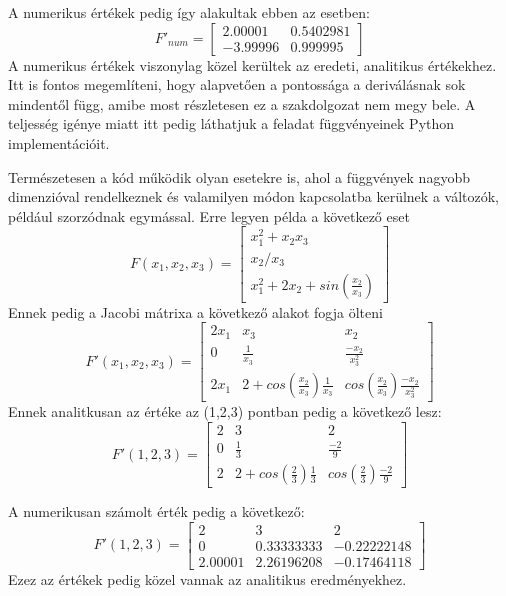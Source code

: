 \documentclass{article}
\theoremstyle{definition}
\theoremstyle{theorem}
\begin{document}
A numerikus értékek pedig így alakultak ebben az esetben:
\begin{equation*}
    F'_{num} = \begin{bmatrix}
        2.00001 & 0.5402981 \\
        -3.99996 & 0.999995
    \end{bmatrix}
\end{equation*}
A numerikus értékek viszonylag közel kerültek az eredeti, analitikus értékekhez.
Itt is fontos megemlíteni, hogy alapvetően a pontossága a deriválásnak sok mindentől függ, amibe most részletesen ez a szakdolgozat nem megy bele. A teljesség igénye miatt itt pedig láthatjuk a feladat függvényeinek Python implementációit.

Természetesen a kód működik olyan esetekre is, ahol a függvények nagyobb dimenzióval rendelkeznek és valamilyen módon kapcsolatba kerülnek a változók, például szorzódnak egymással. Erre legyen példa a következő eset
\begin{equation*}
    F(x_1,x_2,x_3) = \begin{bmatrix}
        x_1 ^ 2 + x_2 x_3 \\
        x_2/x_3 \\
        x_1 ^2 + 2 x_2 + sin(\frac{x_2}{x_3})
    \end{bmatrix}
\end{equation*}
 Ennek pedig a Jacobi mátrixa a következő alakot fogja ölteni
 \begin{equation*}
     F'(x_1, x_2, x_3) = \begin{bmatrix}
         2 x_1 & x_3 & x_2 \\
         0 & \frac{1}{x_3} & \frac{-x_2}{x_3^2} \\
         2 x_1 & 2 + cos(\frac{x_2}{x_3}) \frac{1}{x_3} & cos(\frac{x_2}{x_3}) \frac{-x_2}{x_3^2}
     \end{bmatrix}
 \end{equation*}
 Ennek analitkusan az értéke az (1,2,3) pontban pedig a következő lesz:
  \begin{equation*}
     F'(1, 2, 3) = \begin{bmatrix}
         2  & 3 & 2 \\
         0 & \frac{1}{3} & \frac{-2}{9} \\
         2  & 2 + cos(\frac{2}{3}) \frac{1}{3}& cos(\frac{2}{3}) \frac{-2}{9}
     \end{bmatrix}
 \end{equation*}

 A numerikusan számolt érték pedig a következő:
\begin{equation*}
     F'(1, 2, 3) = \begin{bmatrix}
         2  & 3 & 2 \\
         0 & 0.33333333 & -0.22222148 \\
         2.00001  & 2.26196208 & -0.17464118
     \end{bmatrix}
\end{equation*}
Ezez az értékek pedig közel vannak az analitikus eredményekhez.
\end{document}
